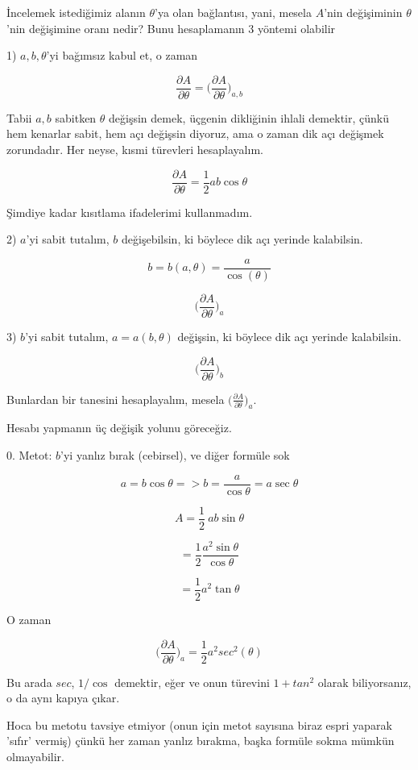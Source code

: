 \documentclass[12pt,fleqn]{article}\usepackage{../../common}
\begin{document}
İncelemek istediğimiz alanın $\theta$'ya olan bağlantısı, yani, mesela
$A$'nin değişiminin $\theta$'nin değişimine oranı nedir? Bunu hesaplamanın
3 yöntemi olabilir

1) $a,b,\theta$'yi bağımsız kabul et, o zaman

$$ \frac{\partial A}{\partial \theta} = 
\bigg( \frac{\partial A}{\partial \theta} \bigg)_{a,b}  $$

Tabii $a,b$ sabitken $\theta$ değişsin demek, üçgenin dikliğinin ihlali
demektir, çünkü hem kenarlar sabit, hem açı değişsin diyoruz, ama o zaman
dik açı değişmek zorundadır. Her neyse, kısmi türevleri hesaplayalım. 

$$ \frac{\partial A}{\partial \theta} = \frac{1}{2}ab \cos\theta $$

Şimdiye kadar kısıtlama ifadelerimi kullanmadım. 

2) $a$'yi sabit tutalım, $b$ değişebilsin, ki böylece dik açı yerinde
kalabilsin. 

$$ b = b(a,\theta) = \frac{a}{\cos(\theta)} $$

$$ \bigg( \frac{\partial A}{\partial \theta} \bigg)_{a}  $$

3) $b$'yi sabit tutalım, $a = a(b,\theta)$ değişsin, ki böylece dik açı yerinde
kalabilsin. 

$$ \bigg( \frac{\partial A}{\partial \theta} \bigg)_{b}  $$

Bunlardan bir tanesini hesaplayalım, mesela $\bigg( \frac{\partial A}{\partial 
\theta} \bigg)_{a} $.

Hesabı yapmanın üç değişik yolunu göreceğiz. 

0. Metot: $b$'yi yanlız bırak (cebirsel), ve diğer formüle sok

$$ a = b \cos \theta => b = \frac{a}{\cos\theta} = a \sec\theta$$

$$ A = \frac{1}{2} \ ab \sin\theta $$

$$ = \frac{1}{2} \frac{a^2 \sin \theta}{\cos \theta} $$

$$ = \frac{1}{2} a^2 \tan \theta $$

O zaman 

$$ \bigg( \frac{\partial A}{\partial \theta} \bigg)_{a} = 
\frac{1}{2}a^2sec^2(\theta)
$$

Bu arada $sec$, $1/\cos$ demektir, eğer ve onun türevini $1+tan^2$ olarak
biliyorsanız, o da aynı kapıya çıkar. 

Hoca bu metotu tavsiye etmiyor (onun için metot sayısına biraz espri yaparak
'sıfır' vermiş) çünkü her zaman yanlız bırakma, başka formüle sokma mümkün
olmayabilir.
\end{document}
